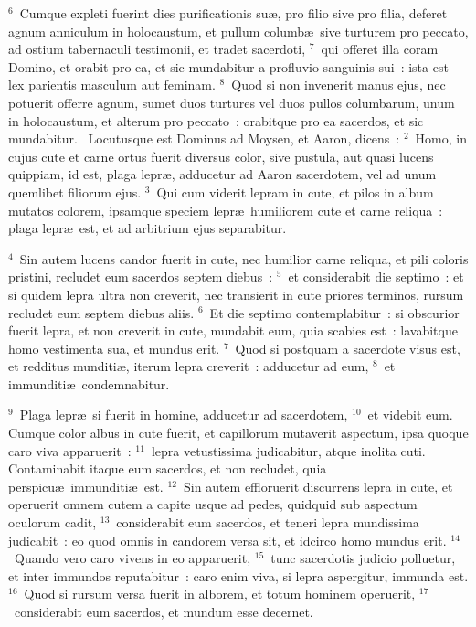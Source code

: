 ${}^{6}$~Cumque expleti fuerint dies purificationis su\ae , pro filio sive pro filia, deferet agnum anniculum in holocaustum, et pullum columb\ae\ sive turturem pro peccato, ad ostium tabernaculi testimonii, et tradet sacerdoti,
${}^{7}$~qui offeret illa coram Domino, et orabit pro ea, et sic mundabitur a profluvio sanguinis sui~: ista est lex parientis masculum aut feminam.
${}^{8}$~Quod si non invenerit manus ejus, nec potuerit offerre agnum, sumet duos turtures vel duos pullos columbarum, unum in holocaustum, et alterum pro peccato~: orabitque pro ea sacerdos, et sic mundabitur.
~Locutusque est Dominus ad Moysen, et Aaron, dicens~:
${}^{2}$~Homo, in cujus cute et carne ortus fuerit diversus color, sive pustula, aut quasi lucens quippiam, id est, plaga lepr\ae , adducetur ad Aaron sacerdotem, vel ad unum quemlibet filiorum ejus.
${}^{3}$~Qui cum viderit lepram in cute, et pilos in album mutatos colorem, ipsamque speciem lepr\ae\ humiliorem cute et carne reliqua~: plaga lepr\ae\ est, et ad arbitrium ejus separabitur.


${}^{4}$~Sin autem lucens candor fuerit in cute, nec humilior carne reliqua, et pili coloris pristini, recludet eum sacerdos septem diebus~:
${}^{5}$~et considerabit die septimo~: et si quidem lepra ultra non creverit, nec transierit in cute priores terminos, rursum recludet eum septem diebus aliis.
${}^{6}$~Et die septimo contemplabitur~: si obscurior fuerit lepra, et non creverit in cute, mundabit eum, quia scabies est~: lavabitque homo vestimenta sua, et mundus erit.
${}^{7}$~Quod si postquam a sacerdote visus est, et redditus munditi\ae , iterum lepra creverit~: adducetur ad eum,
${}^{8}$~et immunditi\ae\ condemnabitur.


${}^{9}$~Plaga lepr\ae\ si fuerit in homine, adducetur ad sacerdotem,
${}^{10}$~et videbit eum. Cumque color albus in cute fuerit, et capillorum mutaverit aspectum, ipsa quoque caro viva apparuerit~:
${}^{11}$~lepra vetustissima judicabitur, atque inolita cuti. Contaminabit itaque eum sacerdos, et non recludet, quia perspicu\ae\ immunditi\ae\ est.
${}^{12}$~Sin autem effloruerit discurrens lepra in cute, et operuerit omnem cutem a capite usque ad pedes, quidquid sub aspectum oculorum cadit,
${}^{13}$~considerabit eum sacerdos, et teneri lepra mundissima judicabit~: eo quod omnis in candorem versa sit, et idcirco homo mundus erit.
${}^{14}$~Quando vero caro vivens in eo apparuerit,
${}^{15}$~tunc sacerdotis judicio polluetur, et inter immundos reputabitur~: caro enim viva, si lepra aspergitur, immunda est.
${}^{16}$~Quod si rursum versa fuerit in alborem, et totum hominem operuerit,
${}^{17}$~considerabit eum sacerdos, et mundum esse decernet.


